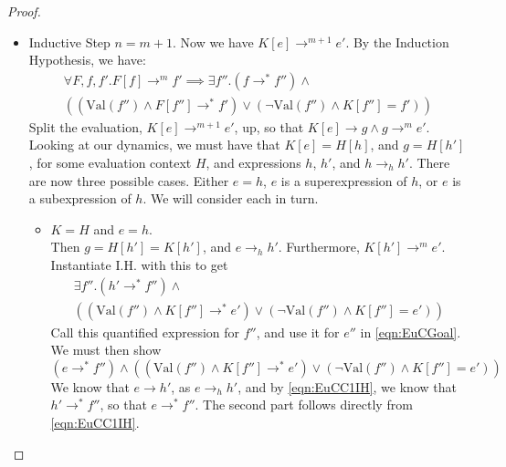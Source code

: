 \documentclass[twoside,11pt,openright]{report}
\theoremstyle{definition}
\newcommand{\expr}{e}
\newcommand{\elctx}{K}
\newcommand{\step}{\rightarrow}
\newcommand{\stepS}{\rightarrow^*}
\newcommand{\hstep}{\rightarrow_h}
\newcommand{\Val}[1]{\mathrm{Val}(#1)}
\begin{document}
\begin{proof}
\begin{itemize}
    \item Inductive Step $n = m + 1$. Now we have $\elctx[\expr] \step^{m + 1} \expr'$. By the Induction Hypothesis, we have:
    \begin{multline}\label{eqn:EuCIH}
      \forall F, f, f'. F[f] \step^m f' \implies \exists f'' . (f \stepS f'') \land \\
      \left( (\Val{f''} \land F[f''] \stepS f') \lor
      (\neg \Val{f''} \land \elctx[f''] = f') \right)
    \end{multline}
    Split the evaluation, $\elctx[\expr] \step^{m + 1} \expr'$, up, so that 
    $\elctx[\expr] \step g \land g \step^{m} \expr'$. Looking at our dynamics, we must have that $\elctx[\expr] = H[h]$, and $g = H[h']$, for some evaluation context $H$, and expressions $h$, $h'$, and $h \hstep h'$.
    There are now three possible cases. Either $\expr = h$, $\expr$ is a superexpression of $h$, or $\expr$ is a subexpression of $h$. We will consider each in turn.
    \begin{itemize}
      \item $\elctx = H$ and $\expr = h$.\\
        Then $g = H[h'] = \elctx[h']$, and $\expr \hstep h'$. 
        Furthermore, $\elctx[h'] \step^m \expr'$. Instantiate I.H. with this to get
        \begin{multline}\label{eqn:EuCC1IH}
          \exists f'' . (h' \stepS f'') \land\\
          \left((\Val{f''} \land \elctx[f''] \stepS \expr') \lor
          (\neg \Val{f''} \land \elctx[f''] = \expr') \right)
        \end{multline}
        Call this quantified expression for $f''$, and use it for $\expr''$ in \ref{eqn:EuCGoal}. We must then show
        \begin{equation*}
          (\expr \stepS f'') \land 
          \left( (\Val{f''} \land \elctx[f''] \stepS \expr') \lor
          (\neg \Val{f''} \land \elctx[f''] = \expr') \right)
        \end{equation*}
        We know that $\expr \step h'$, as $\expr \hstep h'$, and by 
        \ref{eqn:EuCC1IH}, we know that $h' \stepS f''$, so that $\expr \stepS f''$. The second part follows directly from \ref{eqn:EuCC1IH}.
      

\end{itemize}
\end{itemize}
\end{proof}
\end{document}
